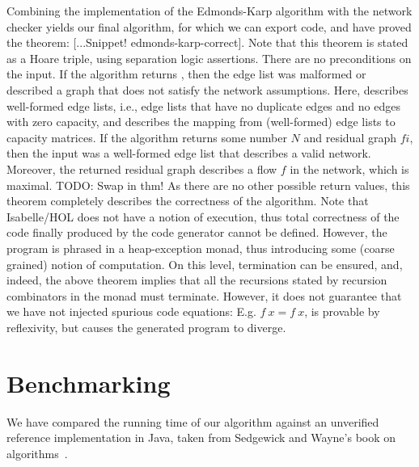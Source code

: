 \documentclass{llncs}
\begin{document}
  Combining the implementation of the Edmonds-Karp algorithm with the network checker yields our final algorithm,
  for which we can export code, and have proved the theorem: [...Snippet! edmonds-karp-correct]. 
  Note that this theorem is stated as a Hoare triple, using separation logic assertions. There are no preconditions on the input.
  If the algorithm returns , then the edge list was malformed or described a graph that does not satisfy the network assumptions.
  Here,  describes well-formed edge lists, i.e., edge lists that have no duplicate edges and no edges with zero capacity,
  and  describes the mapping from (well-formed) edge lists to capacity matrices.
  If the algorithm returns some number $N$ and residual graph $fi$, then the input was a well-formed edge list that describes a valid network.
  Moreover, the returned residual graph describes a flow $f$ in the network, which is maximal. TODO: Swap in thm!
  As there are no other possible return values, this theorem completely describes the correctness of the algorithm. 
  Note that Isabelle/HOL does not have a notion of execution, thus total correctness of the code finally produced by the code 
  generator cannot be defined. However, the program is phrased in a heap-exception monad, thus introducing some (coarse grained) notion of
  computation. On this level, termination can be ensured, and, indeed, the above theorem implies that all the recursions stated by recursion 
  combinators in the monad must terminate. However, it does not guarantee that we have not injected spurious code equations: E.g. $f~x = f~x$,
  is provable by reflexivity, but causes the generated program to diverge.

\section{Benchmarking}
  We have compared the running time of our algorithm against an unverified reference implementation in Java, taken from Sedgewick and Wayne's book on algorithms~\cite{SeWa11}.
  
\end{document}
